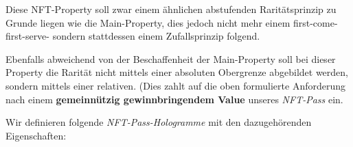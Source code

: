 
Diese NFT-Property soll zwar einem ähnlichen abstufenden Raritätsprinzip zu Grunde liegen wie die Main-Property, dies jedoch nicht mehr einem first-come-first-serve- sondern stattdessen einem Zufallsprinzip folgend.

Ebenfalls abweichend von der Beschaffenheit der Main-Property soll bei dieser Pro\-perty die Rarität nicht mittels einer absoluten Obergrenze abgebildet werden, sondern mittels einer relativen. (Dies zahlt auf die oben formulierte Anforderung nach einem \textbf{gemeinnützig gewinnbringendem Value} unseres \textit{NFT-Pass} ein.

\vspace{0.3cm}

\begin{NFT-Prop}

Wir definieren folgende \textit{NFT-Pass-Hologramme} mit den dazugehörenden Eigenschaften:


\end{NFT-Prop}

